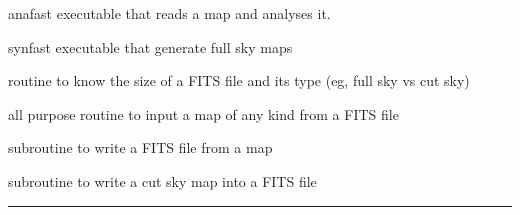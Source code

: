 \begin{related}
  \begin{sulist}{} %
  \item[anafast] executable that reads a \healpix map and analyses it. 
  \item[synfast] executable that generate full sky \healpix maps
  \item[\htmlref{getsize\_fits}{sub:getsize_fits}] routine to know the size of a FITS file and its type (eg, full sky vs cut sky)
  \item[\htmlref{input\_map}{sub:input_map}] all purpose routine to input a map of any kind from a FITS file
  \item[\htmlref{output\_map}{sub:output_map}] subroutine to write a FITS file from a \healpix map
  \item[\htmlref{write\_fits\_cut4}{sub:write_fits_cut4}] subroutine to write a cut sky map into a FITS file
  \end{sulist}
\end{related}

\rule{\hsize}{2mm}

\newpage
